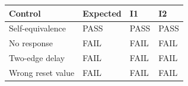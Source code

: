 \begin{tabular}{llll}
\toprule
Control & Expected & I1 & I2 \\
\midrule
Self-equivalence & PASS & PASS & PASS \\
No response & FAIL & FAIL & FAIL \\
Two-edge delay & FAIL & FAIL & FAIL \\
Wrong reset value & FAIL & FAIL & FAIL \\
\bottomrule
\end{tabular}
